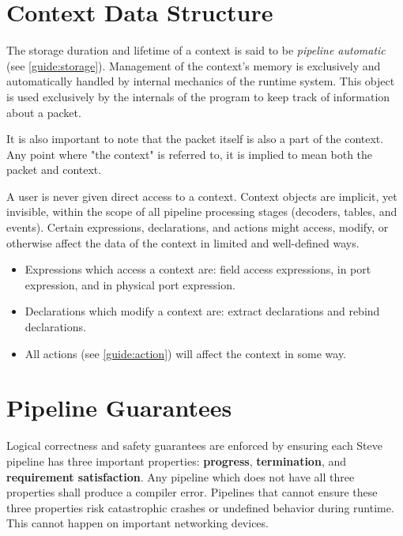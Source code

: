 \section{Context Data Structure} \label{guide:context}

The storage duration and lifetime of a context is said to be \textit{pipeline automatic} (see \ref{guide:storage}). Management of the context's memory is exclusively and automatically handled by internal mechanics of the runtime system. This object is used exclusively by the internals of the program to keep track of information about a packet.

It is also important to note that the packet itself is also a part of the context. Any point where "the context" is referred to, it is implied to mean both the packet and context.

A user is never given direct access to a context. Context objects are implicit, yet invisible, within the scope of all pipeline processing stages (decoders, tables, and events). Certain expressions, declarations, and actions might access, modify, or otherwise affect the data of the context in limited and well-defined ways.

\begin{itemize}
\item Expressions which access a context are: field access expressions, in port expression, and in physical port expression.

\item Declarations which modify a context are: extract declarations and rebind declarations.

\item All actions (see \ref{guide:action}) will affect the context in some way.
\end{itemize}

\section{Pipeline Guarantees} \label{guide:pipeline_checking}

Logical correctness and safety guarantees are enforced by ensuring each Steve pipeline has three important properties: \textbf{progress}, \textbf{termination}, and \textbf{requirement satisfaction}. Any pipeline which does not have all three properties shall produce a compiler error. Pipelines that cannot ensure these three properties risk catastrophic crashes or undefined behavior during runtime. This cannot happen on important networking devices.

